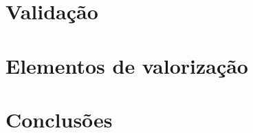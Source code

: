 \documentclass[a4paper]{article}
\begin{document}
\section{Validação}

\section{Elementos de valorização}

\section{Conclusões}
\end{document}
